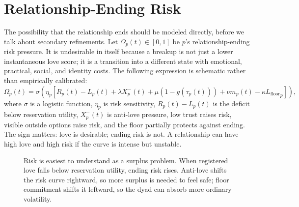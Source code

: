 \documentclass[11pt]{article}
\newcommand{\Lfloor}{L_{\mathrm{floor}}}
\newcommand{\Risk}{\Omega}
\begin{document}
\section{Relationship-Ending Risk}
The possibility that the relationship ends should be modeled directly, before we talk about secondary refinements. Let $\Risk_p(t)\in[0,1]$ be $p$'s relationship-ending risk pressure. It is undesirable in itself because a breakup is not just a lower instantaneous love score; it is a transition into a different state with emotional, practical, social, and identity costs. The following expression is schematic rather than empirically calibrated:
\begin{equation}
\Risk_p(t)=\sigma\left(\eta_p\left[R_p(t)-L_p(t)+\lambda X_p^-(t)+\mu(1-g(\tau_p(t)))+\nu m_p(t)-\kappa {\Lfloor}_p\right]\right),
\end{equation}
where $\sigma$ is a logistic function, $\eta_p$ is risk sensitivity, $R_p(t)-L_p(t)$ is the deficit below reservation utility, $X_p^-(t)$ is anti-love pressure, low trust raises risk, visible outside options raise risk, and the floor partially protects against ending. The sign matters: love is desirable; ending risk is not. A relationship can have high love and high risk if the curve is intense but unstable.

\begin{figure}[ht]
\centering
{}
\caption{Risk is easiest to understand as a surplus problem. When registered love falls below reservation utility, ending risk rises. Anti-love shifts the risk curve rightward, so more surplus is needed to feel safe; floor commitment shifts it leftward, so the dyad can absorb more ordinary volatility.}
\label{fig:risk}
\end{figure}
\end{document}
